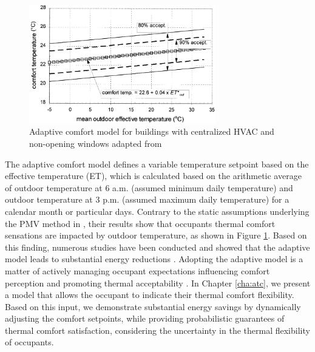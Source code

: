 \begin{figure}[b]
\centering
\includegraphics[width=3.2in,keepaspectratio]{./figs/dear_adaptive_thermal_model.jpg}
\caption{Adaptive comfort model for buildings with centralized HVAC and non-opening windows adapted from \cite{de1998developing}}
\label{fig:background:dear_adaptive_temp}
\end{figure}

The adaptive comfort model defines a variable temperature setpoint based on the effective temperature (ET), which is calculated based on the arithmetic average of outdoor temperature at 6 a.m. (assumed minimum daily temperature) and outdoor temperature at 3 p.m. (assumed maximum daily temperature) for a calendar month or particular days. Contrary to the static assumptions underlying the PMV method in \cite{fanger1970thermal}, their results show that occupants thermal comfort sensations are impacted by outdoor temperature, as shown in Figure \ref{fig:background:dear_adaptive_temp}. Based on this finding, numerous studies have been conducted and showed that the adaptive model leads to substantial energy reductions \citep{mui2003adaptive,egan2010the,ward2010automate,yang2013development,west2014trial,chew2015adaptive}. Adopting the adaptive model is a matter of actively managing occupant expectations influencing comfort perception and promoting thermal acceptability \citep{ward2010automate}. In Chapter \ref{cha:atc}, we present a model that allows the occupant to indicate their thermal comfort flexibility. Based on this input, we demonstrate substantial energy savings by dynamically adjusting the comfort setpoints, while providing probabilistic guarantees of thermal comfort satisfaction, considering the uncertainty in the thermal flexibility of occupants.


